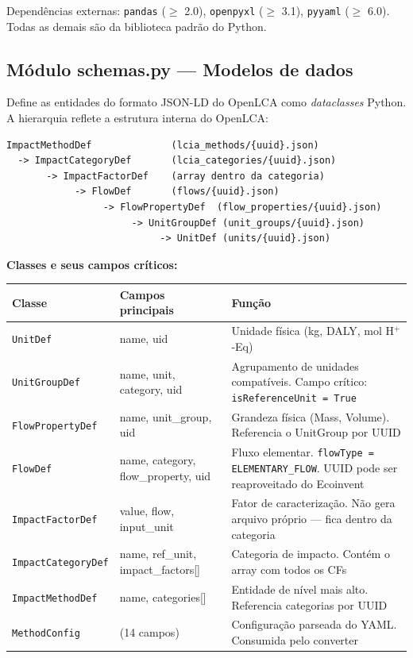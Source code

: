 Depend\^encias externas: \texttt{pandas} ($\geq$ 2.0), \texttt{openpyxl} ($\geq$ 3.1), \texttt{pyyaml} ($\geq$ 6.0). Todas as demais s\~ao da biblioteca padr\~ao do Python.

\subsection{M\'odulo schemas.py --- Modelos de dados}

Define as entidades do formato JSON-LD do OpenLCA como \textit{dataclasses} Python. A hierarquia reflete a estrutura interna do OpenLCA:

\begin{lstlisting}
ImpactMethodDef              (lcia_methods/{uuid}.json)
  -> ImpactCategoryDef       (lcia_categories/{uuid}.json)
       -> ImpactFactorDef    (array dentro da categoria)
            -> FlowDef       (flows/{uuid}.json)
                 -> FlowPropertyDef  (flow_properties/{uuid}.json)
                      -> UnitGroupDef (unit_groups/{uuid}.json)
                           -> UnitDef (units/{uuid}.json)
\end{lstlisting}

\textbf{Classes e seus campos cr\'iticos:}

\begin{longtable}{p{3.5cm}p{3.5cm}p{7cm}}
\toprule
\textbf{Classe} & \textbf{Campos principais} & \textbf{Fun\c{c}\~ao} \\
\midrule
\endhead
\texttt{UnitDef} & name, uid & Unidade f\'isica (kg, DALY, mol H$^+$-Eq) \\
\addlinespace
\texttt{UnitGroupDef} & name, unit, category, uid & Agrupamento de unidades compat\'iveis. Campo cr\'itico: \texttt{isReferenceUnit = True} \\
\addlinespace
\texttt{FlowPropertyDef} & name, unit\_group, uid & Grandeza f\'isica (Mass, Volume). Referencia o UnitGroup por UUID \\
\addlinespace
\texttt{FlowDef} & name, category, flow\_property, uid & Fluxo elementar. \texttt{flowType = ELEMENTARY\_FLOW}. UUID pode ser reaproveitado do Ecoinvent \\
\addlinespace
\texttt{ImpactFactorDef} & value, flow, input\_unit & Fator de caracteriza\c{c}\~ao. N\~ao gera arquivo pr\'oprio --- fica dentro da categoria \\
\addlinespace
\texttt{ImpactCategoryDef} & name, ref\_unit, impact\_factors[] & Categoria de impacto. Cont\'em o array com todos os CFs \\
\addlinespace
\texttt{ImpactMethodDef} & name, categories[] & Entidade de n\'ivel mais alto. Referencia categorias por UUID \\
\addlinespace
\texttt{MethodConfig} & (14 campos) & Configura\c{c}\~ao parseada do YAML. Consumida pelo converter \\
\bottomrule
\end{longtable}


